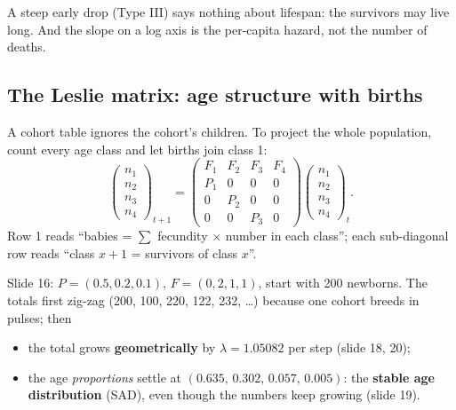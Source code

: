 \begin{trap}
A steep early drop (Type III) says nothing about lifespan: the survivors may live long. And the slope on a log axis is
the per-capita hazard, not the number of deaths.
\end{trap}

\subsection{The Leslie matrix: age structure with births}
A cohort table ignores the cohort's children. To project the whole population, count every age class and let births
join class 1:
\[
\begin{pmatrix}n_1\\n_2\\n_3\\n_4\end{pmatrix}_{t+1}=
\begin{pmatrix}F_1&F_2&F_3&F_4\\P_1&0&0&0\\0&P_2&0&0\\0&0&P_3&0\end{pmatrix}
\begin{pmatrix}n_1\\n_2\\n_3\\n_4\end{pmatrix}_{t}.
\]
Row 1 reads ``babies = $\sum$ fecundity $\times$ number in each class''; each sub-diagonal row reads ``class $x+1$ =
survivors of class $x$''.

Slide 16: $P=(0.5,0.2,0.1)$, $F=(0,2,1,1)$, start with 200 newborns. The totals first zig-zag
(200, 100, 220, 122, 232, \dots) because one cohort breeds in pulses; then
\begin{itemize}
\item the total grows \textbf{geometrically} by $\lambda=1.05082$ per step (slide 18, 20);
\item the age \emph{proportions} settle at $(0.635,\,0.302,\,0.057,\,0.005)$: the \textbf{stable age distribution}
(SAD), even though the numbers keep growing (slide 19).
\end{itemize}

